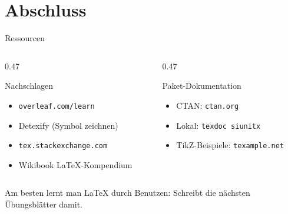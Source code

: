 \section{Abschluss}

\begin{frame}{Ressourcen}
  \begin{columns}[T]
    \begin{column}{0.47\textwidth}
      \begin{kasten}{Nachschlagen}
        \begin{itemize}
          \item \texttt{overleaf.com/learn}
          \item Detexify (Symbol zeichnen)
          \item \texttt{tex.stackexchange.com}
          \item Wikibook \glqq\LaTeX-Kompendium\grqq
        \end{itemize}
      \end{kasten}
    \end{column}
    \begin{column}{0.47\textwidth}
      \begin{kasten}{Paket-Dokumentation}
        \begin{itemize}
          \item CTAN: \texttt{ctan.org}
          \item Lokal: \texttt{texdoc siunitx}
          \item TikZ-Beispiele: \texttt{texample.net}
        \end{itemize}
      \end{kasten}
    \end{column}
  \end{columns}
  \vspace{0.5em}
  \begin{merke}
    Am besten lernt man \LaTeX{} durch Benutzen: Schreibt die nächsten Übungsblätter damit.
  \end{merke}
\end{frame}

\begin{frame}
\end{frame}
